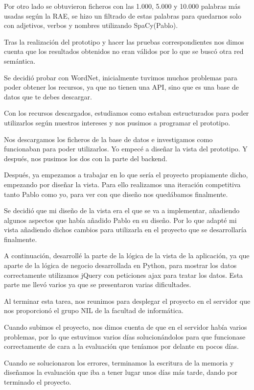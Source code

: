Por otro lado se obtuvieron ficheros con las 1.000, 5.000 y 10.000 palabras más usadas según la RAE, se hizo un filtrado de estas palabras para quedarnos solo con adjetivos, verbos y nombres utilizando SpaCy(Pablo).

Tras la realización del prototipo y hacer las pruebas correspondientes nos dimos cuenta que los resultados obtenidos no eran válidos por lo que se buscó otra red semántica.

Se decidió probar con WordNet, inicialmente tuvimos muchos problemas para poder obtener los recursos, ya que no tienen una API, sino que es una base de datos que te debes descargar.


Con los recursos descargados, estudiamos como estaban estructurados para poder utilizarlos según nuestros intereses y nos pusimos a programar el prototipo.

Nos descargamos los ficheros de la base de datos e investigamos como funcionaban para poder utilizarlos. Yo empecé a diseñar la vista del prototipo. Y después, nos pusimos los dos con la parte del backend.


Después, ya empezamos a trabajar en lo que sería el proyecto propiamente dicho, empezando por diseñar la vista. Para ello realizamos una iteración competitiva tanto Pablo como yo, para ver con que diseño nos quedábamos finalmente.

Se decidió que mi diseño de la vista era el que se va a implementar, añadiendo algunos aspectos que había añadido Pablo en su diseño. Por lo que adapté mi vista añadiendo dichos cambios para utilizarla en el proyecto que se desarrollaría finalmente.

A continuación, desarrollé la parte de la lógica de la vista de la aplicación, ya que aparte de la lógica de negocio desarrollada en Python, para mostrar los datos correctamente utilizamos jQuery con peticiones ajax para tratar los datos. Esta parte me llevó varios ya que se presentaron varias dificultades.

Al terminar esta tarea, nos reunimos para desplegar el proyecto en el servidor que nos proporcionó el grupo NIL de la facultad de informática. 

Cuando subimos el proyecto, nos dimos cuenta de que en el servidor había varios problemas, por lo que estuvimos varios días solucionándolos para que funcionase correctamente de cara a la evaluación que teníamos por delante en pocos días.


Cuando se solucionaron los errores, terminamos la escritura de la memoria y diseñamos la evaluación que iba a tener lugar unos días más tarde, dando por terminado el proyecto.


